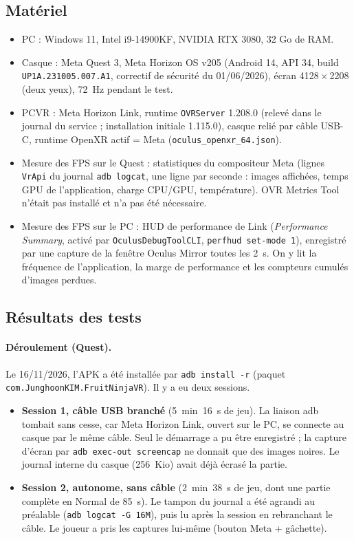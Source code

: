 \documentclass[11pt,a4paper]{article}
\begin{document}
\subsection{Matériel}

\begin{itemize}
\item PC : Windows 11, Intel i9-14900KF, NVIDIA RTX 3080, 32 Go de RAM.
\item Casque : Meta Quest 3, Meta Horizon OS v205 (Android 14, API 34, build \texttt{UP1A.231005.007.A1},
  correctif de sécurité du 01/06/2026), écran 4128\,$\times$\,2208 (deux yeux), 72~Hz pendant le test.
\item PCVR : Meta Horizon Link, runtime \texttt{OVRServer} 1.208.0 (relevé dans le journal du service ;
  installation initiale 1.115.0), casque relié par câble USB-C, runtime OpenXR actif = Meta
  (\texttt{oculus\_openxr\_64.json}).
\item Mesure des FPS sur le Quest : statistiques du compositeur Meta (lignes \texttt{VrApi} du journal
  \texttt{adb logcat}, une ligne par seconde : images affichées, temps GPU de l'application, charge CPU/GPU,
  température). OVR Metrics Tool n'était pas installé et n'a pas été nécessaire.
\item Mesure des FPS sur le PC : HUD de performance de Link (\emph{Performance Summary}, activé par
  \texttt{OculusDebugToolCLI}, \texttt{perfhud set-mode 1}), enregistré par une capture de la fenêtre
  Oculus Mirror toutes les 2~s. On y lit la fréquence de l'application, la marge de performance et les
  compteurs cumulés d'images perdues.
\end{itemize}

\subsection{Résultats des tests}
\label{sec:tests}

\paragraph{Déroulement (Quest).} Le 16/11/2026, l'APK a été installée par \texttt{adb install -r}
(paquet \texttt{com.JunghoonKIM.FruitNinjaVR}). Il y a eu deux sessions.
\begin{itemize}
\item \textbf{Session 1, câble USB branché} (5~min~16~s de jeu). La liaison adb tombait sans cesse, car
  Meta Horizon Link, ouvert sur le PC, se connecte au casque par le même câble. Seul le démarrage a pu être
  enregistré ; la capture d'écran par \texttt{adb exec-out screencap} ne donnait que des images noires.
  Le journal interne du casque (256~Kio) avait déjà écrasé la partie.
\item \textbf{Session 2, autonome, sans câble} (2~min~38~s de jeu, dont une partie complète en Normal de
  85~s). Le tampon du journal a été agrandi au préalable (\texttt{adb logcat -G 16M}), puis lu après la
  session en rebranchant le câble. Le joueur a pris les captures lui-même (bouton Meta + gâchette).
\end{itemize}
\end{document}
